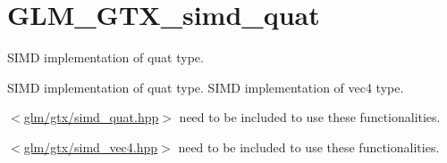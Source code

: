 \hypertarget{group__gtx__simd__vec4}{\section{G\-L\-M\-\_\-\-G\-T\-X\-\_\-simd\-\_\-quat}
\label{group__gtx__simd__vec4}
}


S\-I\-M\-D implementation of quat type.  


S\-I\-M\-D implementation of quat type. S\-I\-M\-D implementation of vec4 type.

$<$\hyperlink{simd__quat_8hpp}{glm/gtx/simd\-\_\-quat.\-hpp}$>$ need to be included to use these functionalities.

$<$\hyperlink{simd__vec4_8hpp}{glm/gtx/simd\-\_\-vec4.\-hpp}$>$ need to be included to use these functionalities. 